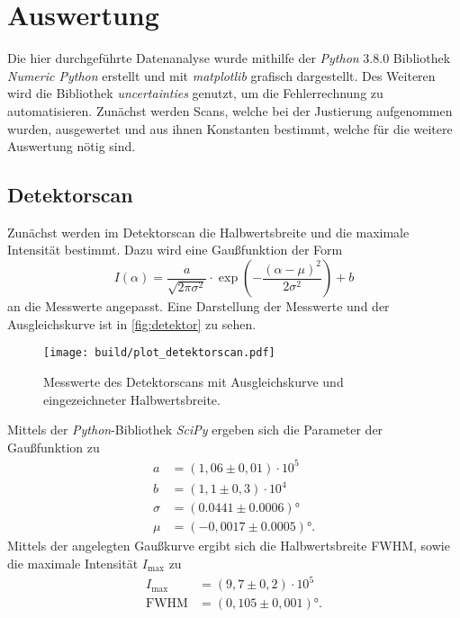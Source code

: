 \section{Auswertung}
Die hier durchgeführte Datenanalyse wurde mithilfe der \textit{Python} 3.8.0 Bibliothek
\textit{Numeric Python} \cite{numpy} erstellt und mit \textit{matplotlib} \cite{matplotlib} grafisch
dargestellt. Des Weiteren wird die Bibliothek \textit{uncertainties} \cite{uncertainties} genutzt,
um die Fehlerrechnung zu automatisieren.
Zunächst werden Scans, welche bei der Justierung aufgenommen wurden, ausgewertet und 
aus ihnen Konstanten bestimmt, welche für die weitere Auswertung nötig sind.
\subsection{Detektorscan}
Zunächst werden im Detektorscan die Halbwertsbreite und die maximale Intensität bestimmt.
Dazu wird eine Gaußfunktion der Form 
\begin{equation*}
    I(\alpha) = \frac{a}{\sqrt{2 \pi \sigma^2}} \cdot \exp\left(- \frac{(\alpha - \mu)^2}{2\sigma^2}\right) + b 
\end{equation*}
an die Messwerte angepasst. Eine Darstellung der Messwerte und der Ausgleichskurve ist in 
\autoref{fig:detektor} zu sehen.
\begin{figure}
    \centering
    \texttt{[image: build/plot\_detektorscan.pdf]}
    \caption{Messwerte des Detektorscans mit Ausgleichskurve und eingezeichneter Halbwertsbreite.}
    \label{fig:detektor}
\end{figure}
Mittels der \textit{Python}-Bibliothek \textit{SciPy} \cite{scipy} ergeben sich die Parameter
der Gaußfunktion zu 
\begin{align*}
    a &= ( 1,06 \pm 0,01)\cdot 10^5 \\
    b &= ( 1,1 \pm 0,3) \cdot 10^4 \\
    \sigma &= (0.0441 \pm 0.0006)° \\
    \mu &= (-0,0017 \pm 0.0005)°.
\end{align*}
Mittels der angelegten Gaußkurve ergibt sich die Halbwertsbreite FWHM, sowie die maximale 
Intensität $I_{\text{max}}$ zu 
\begin{align*}
    I_{\text{max}} &= (9,7 \pm 0,2)\cdot 10^5 \\
    \text{FWHM} &= (0,105 \pm 0,001)°.
\end{align*}

